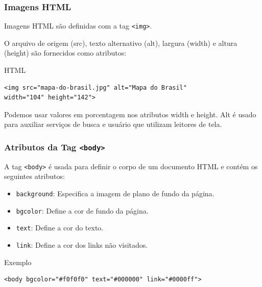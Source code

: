 \documentclass{beamer}
\begin{document}
\begin{frame}[fragile]
\frametitle{Imagens HTML}

Imagens HTML são definidas com a tag \texttt{<img>}.

O arquivo de origem (src), texto alternativo (alt), largura (width) e altura (height) são fornecidos como atributos:

\begin{block}{HTML}
\begin{verbatim}
<img src="mapa-do-brasil.jpg" alt="Mapa do Brasil" 
width="104" height="142">
\end{verbatim}   
\end{block}

Podemos usar valores em porcentagem nos atributos width e height. Alt é usado para auxiliar serviços de busca e usuário que utilizam leitores de tela.

\end{frame}


\begin{frame}[fragile]
\frametitle{Atributos da Tag \texttt{<body>}}

A tag \texttt{<body>} é usada para definir o corpo de um documento HTML e contém os seguintes atributos:

\begin{itemize}
  \item \texttt{background}: Especifica a imagem de plano de fundo da página.
  \item \texttt{bgcolor}: Define a cor de fundo da página.
  \item \texttt{text}: Define a cor do texto.
  \item \texttt{link}: Define a cor dos links não visitados.
\end{itemize}

\begin{block}{Exemplo}
\begin{verbatim}
<body bgcolor="#f0f0f0" text="#000000" link="#0000ff">
\end{verbatim}    
\end{block}

\end{frame}
\end{document}
